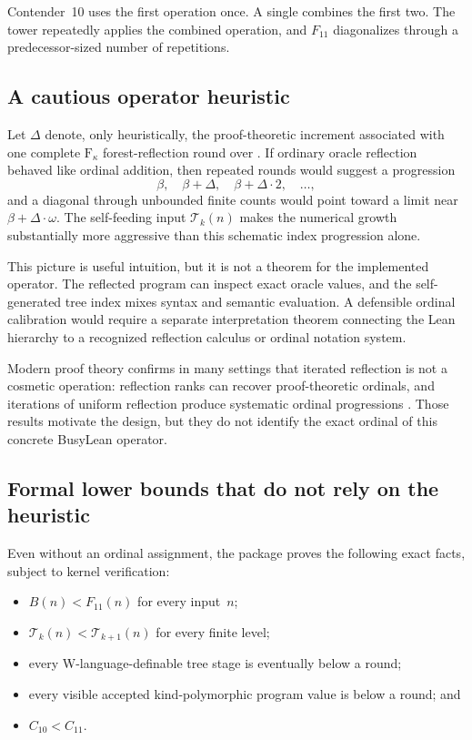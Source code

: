 \documentclass[11pt]{article}
\theoremstyle{definition}
\theoremstyle{remark}
\newcommand{\Fk}{\mathrm{F}_{\kappa}}
\newcommand{\Tower}{\mathcal T}
\newcommand{\lean}[1]{\texttt{\detokenize{#1}}}
\newcommand{\Cten}{C_{10}}
\newcommand{\Celeven}{C_{11}}
\newcommand{\Bfam}{B}
\begin{document}
Contender~10 uses the first operation once. A single \lean{round11} combines the
first two. The tower repeatedly applies the combined operation, and $F_{11}$
diagonalizes through a predecessor-sized number of repetitions.

\subsection{A cautious operator heuristic}

Let $\Delta$ denote, only heuristically, the proof-theoretic increment associated
with one complete $\Fk$ forest-reflection round over \lean{index}. If ordinary
oracle reflection behaved like ordinal addition, then repeated rounds would
suggest a progression
\[
  \beta,
  \quad \beta+\Delta,
  \quad \beta+\Delta\cdot 2,
  \quad \ldots,
\]
and a diagonal through unbounded finite counts would point toward a limit near
$\beta+\Delta\cdot\omega$. The self-feeding input
$\Tower_k(n)$ makes the numerical growth substantially more aggressive than
this schematic index progression alone.

This picture is useful intuition, but it is not a theorem for the implemented
operator. The reflected program can inspect exact oracle values, and the
self-generated tree index mixes syntax and semantic evaluation. A defensible
ordinal calibration would require a separate interpretation theorem connecting
the Lean hierarchy to a recognized reflection calculus or ordinal notation
system.

Modern proof theory confirms in many settings that iterated reflection is not a
cosmetic operation: reflection ranks can recover proof-theoretic ordinals, and
iterations of uniform reflection produce systematic ordinal progressions
\cite{PakhomovWalshRank,PakhomovWalshOmega}. Those results motivate the design,
but they do not identify the exact ordinal of this concrete BusyLean operator.

\subsection{Formal lower bounds that do not rely on the heuristic}

Even without an ordinal assignment, the package proves the following exact
facts, subject to kernel verification:

\begin{itemize}[leftmargin=*]
\item $\Bfam(n)<F_{11}(n)$ for every input~$n$;
\item $\Tower_k(n)<\Tower_{k+1}(n)$ for every finite level;
\item every W-language-definable tree stage is eventually below a round;
\item every visible accepted kind-polymorphic program value is below a round;
  and
\item $\Cten<\Celeven$.
\end{itemize}
\end{document}
